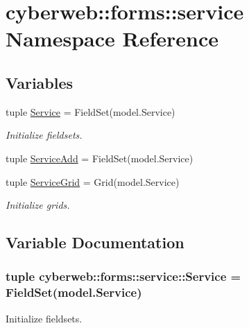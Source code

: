 \hypertarget{namespacecyberweb_1_1forms_1_1service}{\section{cyberweb\-:\-:forms\-:\-:service \-Namespace \-Reference}
\label{namespacecyberweb_1_1forms_1_1service}
}
\subsection*{\-Variables}
\begin{DoxyCompactItemize}
\item 
tuple \hyperlink{namespacecyberweb_1_1forms_1_1service_a08554dc7b31bc4400e9f6d2191dc8337}{\-Service} = \-Field\-Set(model.\-Service)
\begin{DoxyCompactList}\small\item\em \-Initialize fieldsets. \end{DoxyCompactList}\item 
tuple \hyperlink{namespacecyberweb_1_1forms_1_1service_a5844aa892506a7e223b5a6764c2a7eec}{\-Service\-Add} = \-Field\-Set(model.\-Service)
\item 
tuple \hyperlink{namespacecyberweb_1_1forms_1_1service_a7f336b673bbc1bbf67e92ceb309fee98}{\-Service\-Grid} = \-Grid(model.\-Service)
\begin{DoxyCompactList}\small\item\em \-Initialize grids. \end{DoxyCompactList}\end{DoxyCompactItemize}


\subsection{\-Variable \-Documentation}
\hypertarget{namespacecyberweb_1_1forms_1_1service_a08554dc7b31bc4400e9f6d2191dc8337}{
\subsubsection[{\-Service}]{\setlength{\rightskip}{0pt plus 5cm}tuple {\bf cyberweb\-::forms\-::service\-::\-Service} = \-Field\-Set(model.\-Service)}}\label{namespacecyberweb_1_1forms_1_1service_a08554dc7b31bc4400e9f6d2191dc8337}


\-Initialize fieldsets. 

